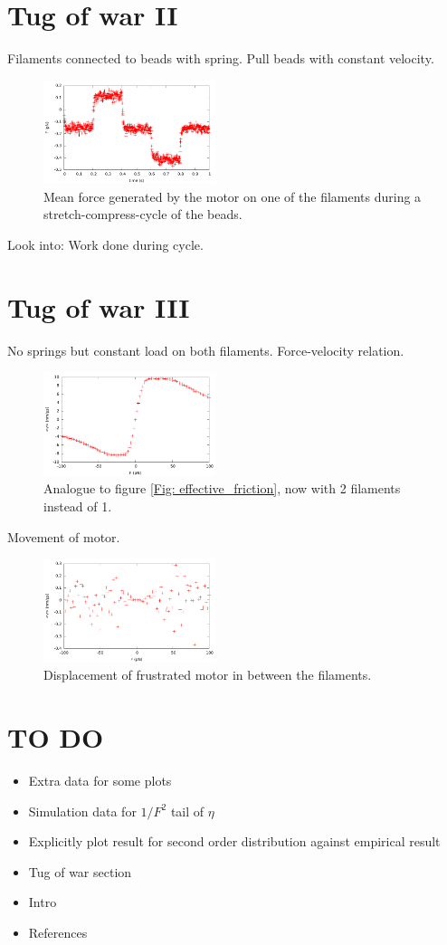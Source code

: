 \documentclass[aps,pre,twocolumn,showpacs,showkeys,a4paper]{revtex4}
\begin{document}
\section{Tug of war II}

Filaments connected to beads with spring. 
Pull beads with constant velocity.
\begin{figure}[t]
\centering
\includegraphics[width=0.45\textwidth,height=!]{tug_v}
\caption{Mean force generated by the motor on one of the filaments during a stretch-compress-cycle of the beads.}
\label{Fig: tug_v}
\end{figure}
Look into: Work done during cycle.
\section{Tug of war III}

No springs but constant load on both filaments.\newline
Force-velocity relation.\newline
\begin{figure}[b]
\centering
\includegraphics[width=0.45\textwidth,height=!]{tug_F}
\caption{Analogue to figure \ref{Fig: effective_friction}, now with 2 filaments instead of 1.}
\label{Fig: tug_F}
\end{figure}
Movement of motor.
\begin{figure}[b]
\centering
\includegraphics[width=0.45\textwidth,height=!]{tug_F_motor}
\caption{Displacement of frustrated motor in between the filaments.}
\label{Fig: tug_F_motor}
\end{figure}

\newpage
\section{TO DO}
\begin{itemize}
\item Extra data for some plots
\item Simulation data for $1/F^2$ tail of $\eta$
\item Explicitly plot result for second order distribution against empirical result
\item Tug of war section
\item Intro
\item References
\end{itemize}



\end{document}
